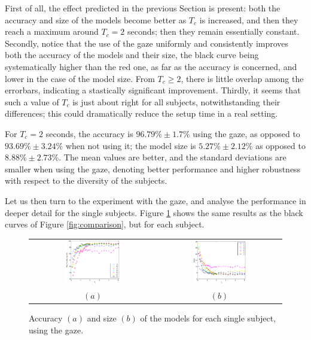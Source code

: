 First of all, the effect predicted in the previous Section is present:
both the accuracy and size of the models become better as $T_c$ is
increased, and then they reach a maximum around $T_c=2$ seconds; then
they remain essentially constant. Secondly, notice that the use of the
gaze uniformly and consistently improves both the accuracy of the
models and their size, the black curve being systematically higher
than the red one, as far as the accuracy is concerned, and lower in
the case of the model size. From $T_c\geq 2$, there is little overlap
among the errorbars, indicating a stastically significant
improvement. Thirdly, it seems that such a value of $T_c$ is just
about right for all subjects, notwithstanding their differences; this
could dramatically reduce the setup time in a real setting.

For $T_c=2$ seconds, the accuracy is $96.79\% \pm 1.7\%$ using the
gaze, as opposed to $93.69\% \pm 3.24\%$ when not using it; the model
size is $5.27\% \pm 2.12\%$ as opposed to $8.88\% \pm 2.73\%$. The
mean values are better, and the standard deviations are smaller when
using the gaze, denoting better performance and higher robustness with
respect to the diversity of the subjects.

Let us then turn to the experiment with the gaze, and analyse the
performance in deeper detail for the single subjects. Figure
\ref{fig:subjects} shows the same results as the black curves of Figure
\ref{fig:comparison}, but for each subject.

\begin{figure}[!ht]
  \centering
    \begin{tabular}{cc}
      \includegraphics[width=0.45\textwidth]{figs/subjects_acc.eps} &
      \includegraphics[width=0.45\textwidth]{figs/subjects_size.eps} \\
      $(a)$ & $(b)$
    \end{tabular}
    \caption{Accuracy $(a)$ and size $(b)$ of the models for each single subject,
    using the gaze.}
    \label{fig:subjects}
\end{figure}

